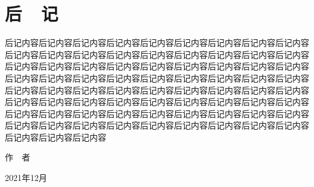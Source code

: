 \documentclass[UTF8,openany,twoside,12pt]{book}
\theoremstyle{plain}
\begin{document}
%
%
%
%
%
%
%




\clearpage
\renewcommand\indexname{索~~引}
{}
\printindex




\chapter{后~~记}

后记内容后记内容后记内容后记内容后记内容后记内容后记内容后记内容后记内容后记内容后记内容后记内容后记内容后记内容后记内容后记内容后记内容后记内容后记内容后记内容后记内容后记内容后记内容后记内容后记内容后记内容后记内容后记内容后记内容后记内容后记内容后记内容后记内容后记内容后记内容后记内容后记内容后记内容后记内容后记内容后记内容后记内容后记内容后记内容后记内容后记内容后记内容后记内容后记内容后记内容后记内容后记内容后记内容后记内容后记内容后记内容后记内容后记内容后记内容后记内容后记内容后记内容后记内容后记内容后记内容后记内容后记内容后记内容后记内容后记内容后记内容后记内容后记内容后记内容后记内容


\vspace{5ex}
\begin{flushright}
作~~者~~~~~~~~~

2021年12月~~~~~
\end{flushright}
\end{document}
